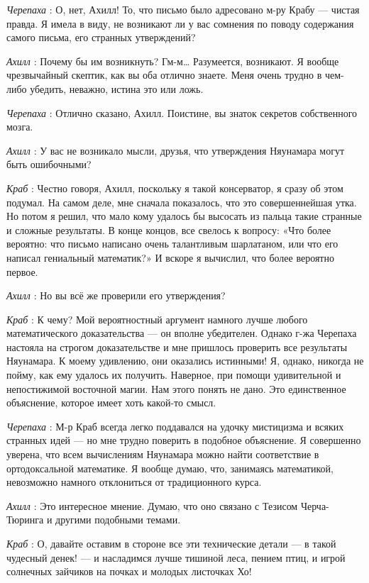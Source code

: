 \documentclass[../main.tex]{subfiles}
\begin{document}
\begin{dialogue}
\emph{Черепаха} : О, нет, Ахилл! То, что письмо было адресовано м-ру Крабу --- чистая правда. Я имела в виду, не возникают ли у вас сомнения по поводу содержания самого письма, его странных утверждений?

\emph{Ахилл} : Почему бы им возникнуть? Гм-м\ldots{} Разумеется, возникают. Я вообще чрезвычайный скептик, как вы оба отлично знаете. Меня очень трудно в чем-либо убедить, неважно, истина это или ложь.

\emph{Черепаха} : Отлично сказано, Ахилл. Поистине, вы знаток секретов собственного мозга.

\emph{Ахилл} : У вас не возникало мысли, друзья, что утверждения Няунамара могут быть ошибочными?

\emph{Краб} : Честно говоря, Ахилл, поскольку я такой консерватор, я сразу об этом подумал. На самом деле, мне сначала показалось, что это совершеннейшая утка. Но потом я решил, что мало кому удалось бы высосать из пальца такие странные и сложные результаты. В конце концов, все свелось к вопросу: «Что более вероятно: что письмо написано очень талантливым шарлатаном, или что его написал гениальный математик?» И вскоре я вычислил, что более вероятно первое.

\emph{Ахилл} : Но вы всё же проверили его утверждения?

\emph{Краб} : К чему? Мой вероятностный аргумент намного лучше любого математического доказательства --- он вполне убедителен. Однако г-жа Черепаха настояла на строгом доказательстве и мне пришлось проверить все результаты Няунамара. К моему удивлению, они оказались истинными! Я, однако, никогда не пойму, как ему удалось их получить. Наверное, при помощи удивительной и непостижимой восточной магии. Нам этого понять не дано. Это единственное объяснение, которое имеет хоть какой-то смысл.

\emph{Черепаха} : М-р Краб всегда легко поддавался на удочку мистицизма и всяких странных идей --- но мне трудно поверить в подобное объяснение. Я совершенно уверена, что всем вычислениям Няунамара можно найти соответствие в ортодоксальной математике. Я вообще думаю, что, занимаясь математикой, невозможно намного отклониться от традиционного курса.

\emph{Ахилл} : Это интересное мнение. Думаю, что оно связано с Тезисом Черча-Тюринга и другими подобными темами.

\emph{Краб} : О, давайте оставим в стороне все эти технические детали --- в такой чудесный денек! --- и насладимся лучше тишиной леса, пением птиц, и игрой солнечных зайчиков на почках и молодых листочках Хо!


\end{dialogue}
\end{document}
